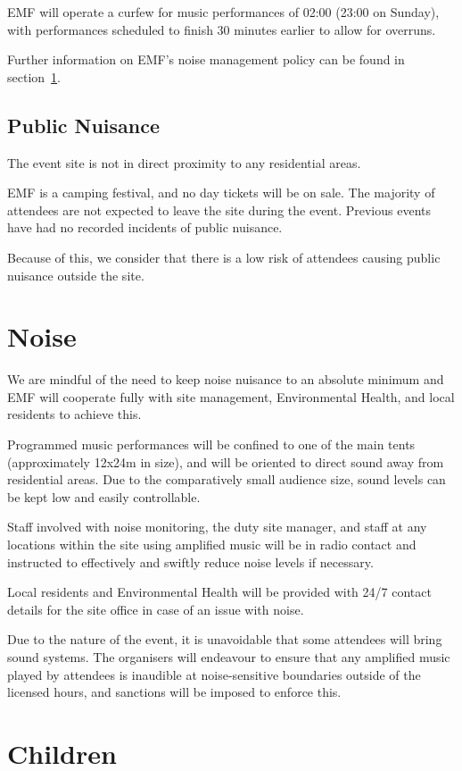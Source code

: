EMF will operate a curfew for music performances of 02:00 (23:00 on Sunday),
with performances scheduled to finish 30 minutes earlier to allow for overruns.

Further information on EMF's noise management policy can be found in
section~\ref{noise}.

\subsection{Public Nuisance}

The event site is not in direct proximity to any residential areas.

EMF is a camping festival, and no day tickets will be on sale. The majority of
attendees are not expected to leave the site during the event. Previous events
have had no recorded incidents of public nuisance.

Because of this, we consider that there is a low risk of attendees causing
public nuisance outside the site.

\section{Noise}
\label{noise}
We are mindful of the need to keep noise nuisance to an absolute minimum and
EMF will cooperate fully with site management, Environmental Health, and local
residents to achieve this.

Programmed music performances will be confined to one of the main tents
(approximately 12x24m in size), and will be oriented to direct sound away from
residential areas. Due to the comparatively small audience size, sound levels
can be kept low and easily controllable.

Staff involved with noise monitoring, the duty site manager, and staff at any
locations within the site using amplified music will be in radio contact and
instructed to effectively and swiftly reduce noise levels if necessary.

Local residents and Environmental Health will be provided with 24/7 contact
details for the site office in case of an issue with noise.

Due to the nature of the event, it is unavoidable that some attendees will
bring sound systems.  The organisers will endeavour to ensure that any
amplified music played by attendees is inaudible at noise-sensitive boundaries
outside of the licensed hours, and sanctions will be imposed to enforce this.

\section{Children}

